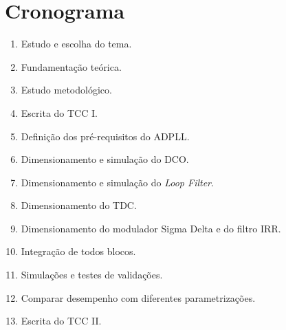 \chapter{Cronograma}

\begin{enumerate}
	\item \label{escolhatema} Estudo e escolha do tema.
	\item \label{refteorico} Fundamentação teórica.
	\item \label{metodologia} Estudo metodológico.
	\item \label{esctcci} Escrita do TCC I.
	\item \label{systemLevel} Definição dos pré-requisitos do ADPLL.
	\item \label{dco} Dimensionamento e simulação do DCO.
	\item \label{loopfilter} Dimensionamento e simulação do \textit{Loop Filter}.
	\item \label{tdc} Dimensionamento do TDC.
	\item \label{sdm_iir} Dimensionamento do modulador Sigma Delta e do filtro IRR.
	\item \label{int_bloks} Integração de todos blocos.
	\item \label{evaluation} Simulações e testes de validações.
	\item \label{comapracoes} Comparar desempenho com diferentes parametrizações.
	\item \label{esctccii} Escrita do TCC II.
\end{enumerate}

